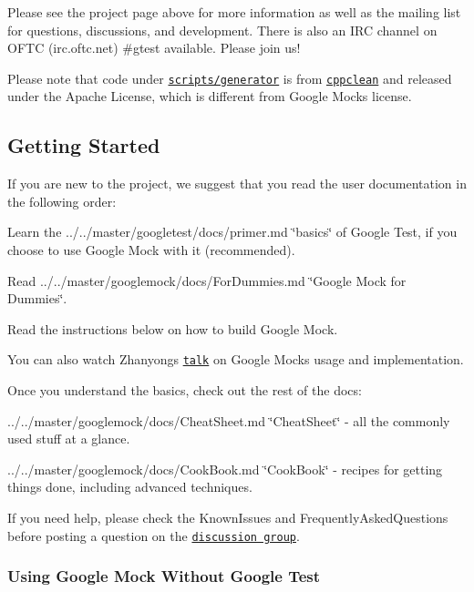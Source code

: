 Please see the project page above for more information as well as the mailing list for questions, discussions, and development. There is also an I\+RC channel on O\+F\+TC (irc.\+oftc.\+net) \#gtest available. Please join us!

Please note that code under \href{scripts/generator/}{\tt scripts/generator} is from \href{http://code.google.com/p/cppclean/}{\tt cppclean} and released under the Apache License, which is different from Google Mock\textquotesingle{}s license.

\subsection*{Getting Started}

If you are new to the project, we suggest that you read the user documentation in the following order\+:


\begin{DoxyItemize}
\item Learn the ../../master/googletest/docs/primer.md \char`\"{}basics\char`\"{} of Google Test, if you choose to use Google Mock with it (recommended).
\item Read ../../master/googlemock/docs/\+For\+Dummies.md \char`\"{}\+Google Mock for Dummies\char`\"{}.
\item Read the instructions below on how to build Google Mock.
\end{DoxyItemize}

You can also watch Zhanyong\textquotesingle{}s \href{http://www.youtube.com/watch?v=sYpCyLI47rM}{\tt talk} on Google Mock\textquotesingle{}s usage and implementation.

Once you understand the basics, check out the rest of the docs\+:


\begin{DoxyItemize}
\item ../../master/googlemock/docs/\+Cheat\+Sheet.md \char`\"{}\+Cheat\+Sheet\char`\"{} -\/ all the commonly used stuff at a glance.
\item ../../master/googlemock/docs/\+Cook\+Book.md \char`\"{}\+Cook\+Book\char`\"{} -\/ recipes for getting things done, including advanced techniques.
\end{DoxyItemize}

If you need help, please check the Known\+Issues and Frequently\+Asked\+Questions before posting a question on the \href{http://groups.google.com/group/googlemock}{\tt discussion group}.

\subsubsection*{Using Google Mock Without Google Test}

